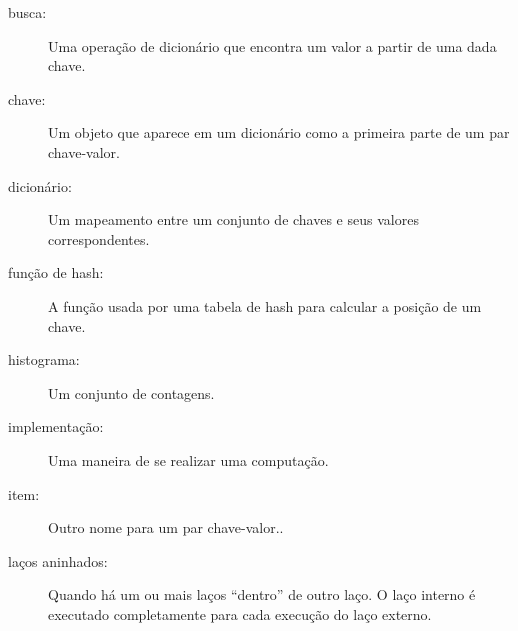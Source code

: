 \begin{description}

  \item[busca:] Uma operação de dicionário que encontra um valor a partir de uma dada chave.

  \item[chave:] Um objeto que aparece em um dicionário como a primeira parte de um par chave-valor.

\item[dicionário:] Um mapeamento entre um conjunto de chaves e seus valores correspondentes.

\item[função de hash:] A função usada por uma tabela de hash para calcular a posição de um chave.

\item[histograma:] Um conjunto de contagens.

\item[implementação:] Uma maneira de se realizar uma computação.

\item[item:] Outro nome para um par chave-valor..

\item[laços aninhados:] Quando há um ou mais laços ``dentro'' de outro laço. O laço interno é executado completamente para cada execução do laço externo.


\end{description}
